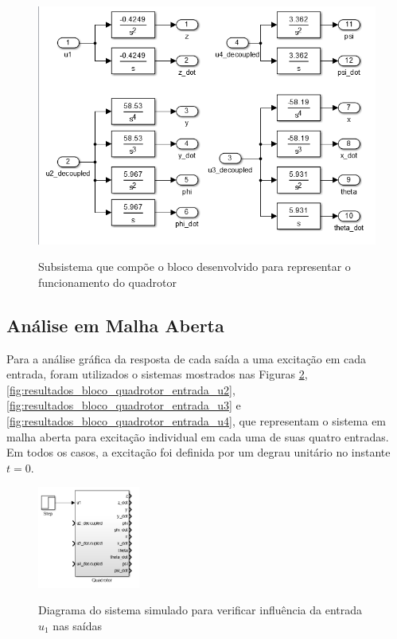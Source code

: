 \begin{figure}[!htb]
    \centering
    \caption{Subsistema que compõe o bloco desenvolvido para representar o funcionamento do quadrotor}
    \includegraphics[width=1\textwidth]{./04-figuras/resultados/resultados_bloco_quadrotor_subsistema}
    \label{fig:resultados-bloco-sistema-drone-subsistema}
\end{figure}

\subsection{Análise em Malha Aberta}
\label{subsec:malha_aberta}

Para a análise gráfica da resposta de cada saída a uma excitação em cada entrada, foram utilizados o sistemas mostrados nas Figuras \ref{fig:resultados_bloco_quadrotor_entrada_u1}, \ref{fig:resultados_bloco_quadrotor_entrada_u2}, \ref{fig:resultados_bloco_quadrotor_entrada_u3} e \ref{fig:resultados_bloco_quadrotor_entrada_u4}, que representam o sistema em malha aberta para excitação individual em cada uma de suas quatro entradas. Em todos os casos, a excitação foi definida por um degrau unitário no instante $t=0$.

\begin{figure}[!htb]
    \centering
    \caption{Diagrama do sistema simulado para verificar influência da entrada $u_1$ nas saídas}
    \includegraphics[width=0.3\textwidth]{./04-figuras/resultados/malha_aberta/resultados_bloco_quadrotor_entrada_u1}
    \label{fig:resultados_bloco_quadrotor_entrada_u1}
\end{figure}

